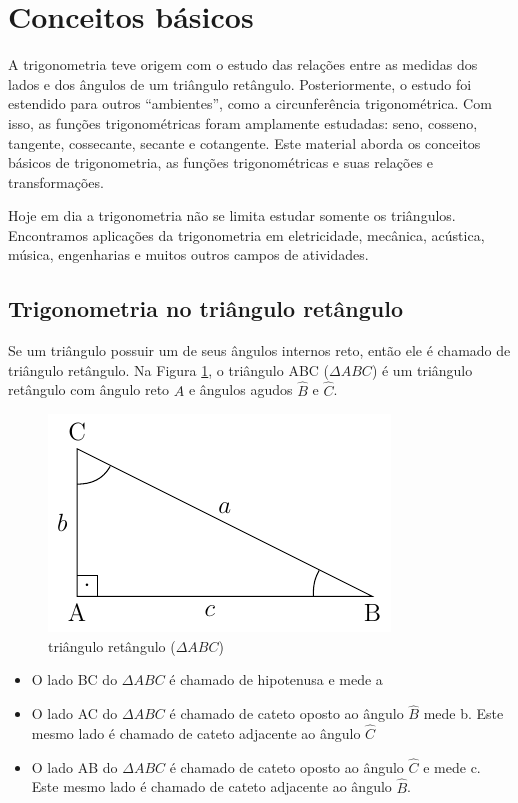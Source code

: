 \section{Conceitos básicos}

A trigonometria teve origem com o estudo das relações entre as medidas dos lados e dos ângulos de um triângulo retângulo. Posteriormente, o estudo foi estendido para outros “ambientes”, como a circunferência trigonométrica. Com isso, as funções trigonométricas foram amplamente estudadas: seno, cosseno, tangente, cossecante, secante e cotangente. Este material aborda os conceitos básicos de trigonometria, as funções trigonométricas e suas relações e transformações.

Hoje em dia a trigonometria não se limita estudar somente os triângulos. Encontramos aplicações da trigonometria em eletricidade, mecânica, acústica, música, engenharias e muitos outros campos de atividades.

\subsection{Trigonometria no triângulo retângulo}

Se um triângulo possuir um de seus ângulos internos reto, então ele é chamado de triângulo retângulo. Na Figura \ref{fig:01}, o triângulo ABC ($\Delta ABC$) é um triângulo retângulo com ângulo reto $\hat{A}$ e ângulos agudos $\hat{B}$ e $\hat{C}$.

    \begin{figure}[h]
        \centering
        \includegraphics[scale=0.8]{Imagens/fig01.pdf}
        \caption{triângulo retângulo ($\Delta ABC$)}
        \label{fig:01}
    \end{figure}

    \begin{itemize}
        \item O lado BC do $\Delta ABC$ é chamado de hipotenusa e mede a
        \item 	O lado AC do $\Delta ABC$ é chamado de cateto oposto ao ângulo $\hat{B}$ mede b. Este mesmo lado é chamado de cateto adjacente ao ângulo $\hat{C}$
        \item O lado AB do $\Delta ABC$ é chamado de cateto oposto ao ângulo $\hat{C}$ e mede c. Este mesmo lado é chamado de cateto adjacente ao ângulo $\hat{B}$.
    \end{itemize}

